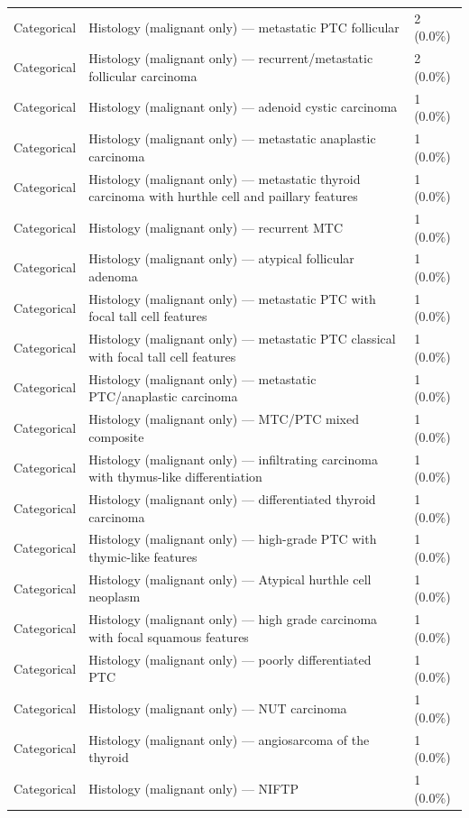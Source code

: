 \begin{table}[htbp]
\begin{tabular}{lll}
Categorical & Histology (malignant only) — metastatic PTC follicular & 2 (0.0\%) \\
Categorical & Histology (malignant only) — recurrent/metastatic follicular carcinoma & 2 (0.0\%) \\
Categorical & Histology (malignant only) — adenoid cystic carcinoma & 1 (0.0\%) \\
Categorical & Histology (malignant only) — metastatic anaplastic carcinoma & 1 (0.0\%) \\
Categorical & Histology (malignant only) — metastatic thyroid carcinoma with hurthle cell and paillary features & 1 (0.0\%) \\
Categorical & Histology (malignant only) — recurrent MTC & 1 (0.0\%) \\
Categorical & Histology (malignant only) — atypical follicular adenoma & 1 (0.0\%) \\
Categorical & Histology (malignant only) — metastatic PTC with focal tall cell features & 1 (0.0\%) \\
Categorical & Histology (malignant only) — metastatic PTC classical with focal tall cell features & 1 (0.0\%) \\
Categorical & Histology (malignant only) — metastatic PTC/anaplastic carcinoma & 1 (0.0\%) \\
Categorical & Histology (malignant only) — MTC/PTC mixed composite & 1 (0.0\%) \\
Categorical & Histology (malignant only) — infiltrating carcinoma with thymus-like differentiation & 1 (0.0\%) \\
Categorical & Histology (malignant only) — differentiated thyroid carcinoma & 1 (0.0\%) \\
Categorical & Histology (malignant only) — high-grade PTC with thymic-like features & 1 (0.0\%) \\
Categorical & Histology (malignant only) — Atypical hurthle cell neoplasm & 1 (0.0\%) \\
Categorical & Histology (malignant only) — high grade carcinoma with focal squamous features & 1 (0.0\%) \\
Categorical & Histology (malignant only) — poorly differentiated PTC & 1 (0.0\%) \\
Categorical & Histology (malignant only) — NUT carcinoma & 1 (0.0\%) \\
Categorical & Histology (malignant only) — angiosarcoma of the thyroid & 1 (0.0\%) \\
Categorical & Histology (malignant only) — NIFTP & 1 (0.0\%) \\

\end{tabular}
\end{table}
